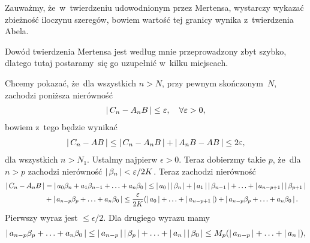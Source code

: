 \documentclass[a4paper,11pt]{article}
\begin{document}
\vspace{\spaceFour}


\start {} Zauważmy, że~w~twierdzeniu udowodnionym przez
Mertensa, wystarczy wykazać zbieżność iloczynu szeregów, bowiem
wartość tej granicy wynika z~twierdzenia Abela.

\vspace{\spaceFour}


\start {} Dowód twierdzenia Mertensa jest według mnie
przeprowadzony zbyt szybko, dlatego tutaj postaramy~się go uzupełnić
w~kilku miejscach.

Chcemy pokazać, że~dla wszystkich $n > N$, przy pewnym skończonym~$N$,
zachodzi poniższa nierówność
\begin{equation}
  \label{eq:Leja-14}
  \begin{split}
    \left| \,  C_{ n } - A_{ n } B  \, \right| \leq \varepsilon, \quad \forall \varepsilon > 0,
  \end{split}
\end{equation}
bowiem z~tego będzie wynikać
\begin{equation}
  \label{eq:Leja-15}
  \begin{split}
    \left| \,  C_{ n } - AB  \, \right| \leq \left| \,  C_{ n } - A_{ n } B  \, \right| + \left| \, 
      A_{ n } B - AB  \, \right| \leq 2 \varepsilon,
  \end{split}
\end{equation}
dla wszystkich $n > N_{ 1 }$. Ustalmy najpierw $\epsilon > 0$. Teraz
dobierzmy takie $p$, że~dla $n > p$ zachodzi nierówność
$\left| \,  \beta_{ n }  \, \right| < \varepsilon / 2K$. Teraz zachodzi nierówność
\begin{equation}
  \label{eq:Leja-16}
  \begin{split}
    \left| \,  C_{ n } - A_{ n } B  \, \right| &= \left| \,  a_{ 0 } \beta_{ n } + a_{ 1 }
      \beta_{ n - 1 } + \ldots + a_{ n } \beta_{ 0 }  \, \right| \leq \left| \,  a_{ 0 }  \, \right|
    \left| \,  \beta_{ n }  \, \right| + \left| \,  a_{ 1 }  \, \right| \left| \,  \beta_{ n - 1 }  \, \right| + \ldots
    + \left| \,  a_{ n - p + 1 }  \, \right|
    \left| \,  \beta_{ p + 1 }  \, \right| \\
    &+ \left| \,  a_{ n - p } \beta_{ p } + \ldots + a_{ n } \beta_{ 0 }  \, \right| \leq
    \frac{ \varepsilon }{ 2K } ( \left| \,  a_{ 0 }  \, \right| + \ldots + \left| \,  a_{ n - p + 1
      }  \, \right| ) + \left| \,  a_{ n - p } \beta_{ p } + \ldots + a_{ n } \beta_{ 0 }
     \, \right|.
  \end{split}
\end{equation}
Pierwszy wyraz jest $\leq \epsilon / 2$. Dla drugiego wyrazu mamy
\begin{equation}
  \label{eq:Leja-17}
  \begin{split}
    \left| \,  a_{ n - p } \beta_{ p } + \ldots + a_{ n } \beta_{ 0 }  \, \right| \leq
    \left| \,  a_{ n - p }  \, \right| \left| \,  \beta_{ p }  \, \right| + \ldots + \left| \,  a_{ n }  \, \right|
    \left| \,  \beta_{ 0 }  \, \right| \leq M_{ p } ( \left| \,  a_{ n - p }  \, \right| + \ldots +
    \left| \,  a_{ n }  \, \right| ),
  \end{split}
\end{equation}
\end{document}
